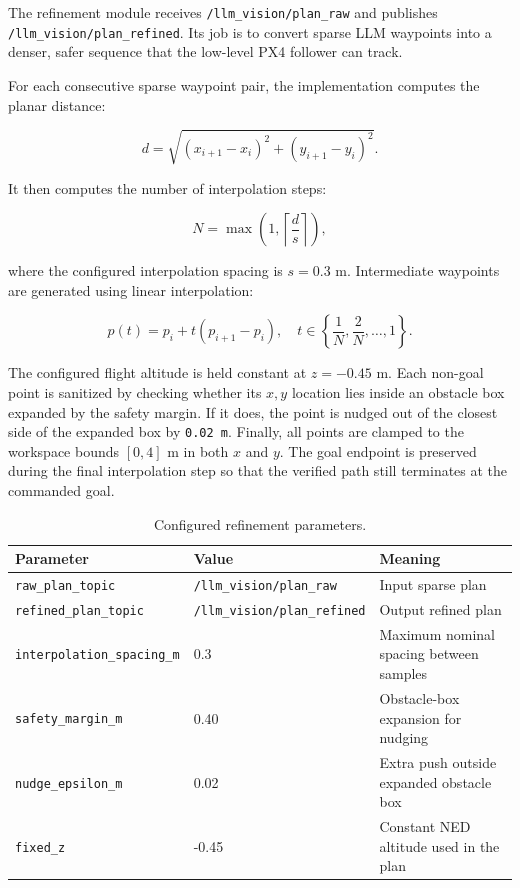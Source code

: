 \documentclass[11pt]{article}
\begin{document}
The refinement module receives \texttt{/llm\_vision/plan\_raw} and publishes \texttt{/llm\_vision/plan\_refined}. Its job is to convert sparse LLM waypoints into a denser, safer sequence that the low-level PX4 follower can track.

For each consecutive sparse waypoint pair, the implementation computes the planar distance:

\[
d = \sqrt{(x_{i+1}-x_i)^2 + (y_{i+1}-y_i)^2}.
\]

It then computes the number of interpolation steps:

\[
N = \max\left(1, \left\lceil \frac{d}{s} \right\rceil\right),
\]

where the configured interpolation spacing is \(s = 0.3\) m. Intermediate waypoints are generated using linear interpolation:

\[
p(t) = p_i + t(p_{i+1}-p_i), \quad t \in \left\{\frac{1}{N}, \frac{2}{N}, \ldots, 1\right\}.
\]

The configured flight altitude is held constant at \(z=-0.45\) m. Each non-goal point is sanitized by checking whether its \(x,y\) location lies inside an obstacle box expanded by the safety margin. If it does, the point is nudged out of the closest side of the expanded box by \texttt{0.02 m}. Finally, all points are clamped to the workspace bounds \([0,4]\) m in both \(x\) and \(y\). The goal endpoint is preserved during the final interpolation step so that the verified path still terminates at the commanded goal.

\begin{table}[H]
\centering
\caption{Configured refinement parameters.}
\label{tab:refinement-params}
\begin{tabular}{lll}
\toprule
Parameter & Value & Meaning \\
\midrule
\texttt{raw\_plan\_topic} & \texttt{/llm\_vision/plan\_raw} & Input sparse plan \\
\texttt{refined\_plan\_topic} & \texttt{/llm\_vision/plan\_refined} & Output refined plan \\
\texttt{interpolation\_spacing\_m} & 0.3 & Maximum nominal spacing between samples \\
\texttt{safety\_margin\_m} & 0.40 & Obstacle-box expansion for nudging \\
\texttt{nudge\_epsilon\_m} & 0.02 & Extra push outside expanded obstacle box \\
\texttt{fixed\_z} & -0.45 & Constant NED altitude used in the plan \\
\bottomrule
\end{tabular}
\end{table}
\end{document}
